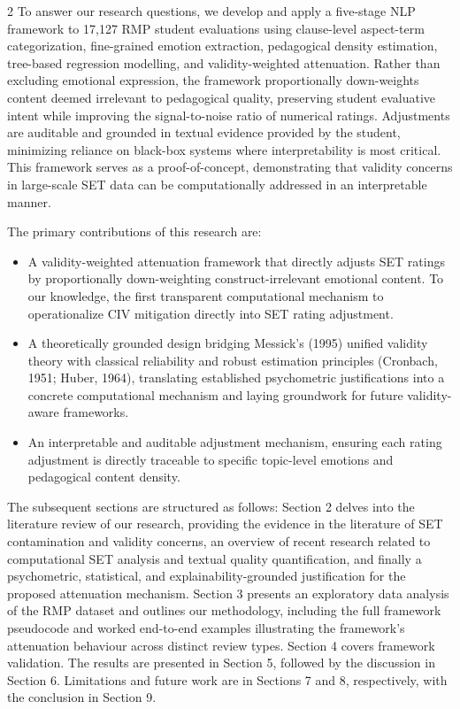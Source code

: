 \documentclass{article}
\begin{document}
\begin{multicols*}{2}
To answer our research questions, we develop and apply a five-stage NLP framework to 17,127 RMP student evaluations using clause-level aspect-term categorization, fine-grained emotion extraction, pedagogical density estimation, tree-based regression modelling, and validity-weighted attenuation. Rather than excluding emotional expression, the framework proportionally down-weights content deemed irrelevant to pedagogical quality, preserving student evaluative intent while improving the signal-to-noise ratio of numerical ratings. Adjustments are auditable and grounded in textual evidence provided by the student, minimizing reliance on black-box systems where interpretability is most critical. This framework serves as a proof-of-concept, demonstrating that validity concerns in large-scale SET data can be computationally addressed in an interpretable manner.\newline

\noindent The primary contributions of this research are:
\begin{itemize}
    \item A validity-weighted attenuation framework that directly adjusts SET ratings by proportionally down-weighting construct-irrelevant emotional content. To our knowledge, the first transparent computational mechanism to operationalize CIV mitigation directly into SET rating adjustment.

    \item A theoretically grounded design bridging Messick's (1995) unified validity theory with classical reliability and robust estimation principles (Cronbach, 1951; Huber, 1964), translating established psychometric justifications into a concrete computational mechanism and laying groundwork for future validity-aware frameworks.

    \item An interpretable and auditable adjustment mechanism, ensuring each rating adjustment is directly traceable to specific topic-level emotions and pedagogical content density. 
\end{itemize}

The subsequent sections are structured as follows: Section 2 delves into the literature review of our research, providing the evidence in the literature of SET contamination and validity concerns, an overview of recent research related to computational SET analysis and textual quality quantification, and finally a psychometric, statistical, and explainability-grounded justification for the proposed attenuation mechanism. Section 3 presents an exploratory data analysis of the RMP dataset and outlines our methodology, including the full framework pseudocode and worked end-to-end examples illustrating the framework's attenuation behaviour across distinct review types. Section 4 covers framework validation. The results are presented in Section 5, followed by the discussion in Section 6. Limitations and future work are in Sections 7 and 8, respectively, with the conclusion in Section 9. 


\end{multicols*}
\end{document}
